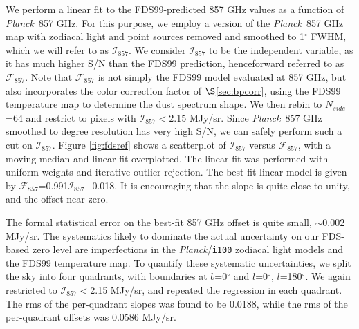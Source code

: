 \documentclass{emulateapj}
\newcommand{\PLANCK}{{\it Planck}}
\begin{document}
We perform a linear fit to the FDS99-predicted 857 GHz values as 
a function of \PLANCK~857 GHz. For this purpose, we employ a version of the 
\PLANCK~857 GHz map with zodiacal light and point sources removed and smoothed 
to 1$^{\circ}$ FWHM, which we will refer to as $\mathcal{I}_{857}$. We 
consider $\mathcal{I}_{857}$ to be the independent variable, as it has much 
higher S/N than the FDS99 prediction, henceforward referred to as 
$\mathcal{F}_{857}$. Note that $\mathcal{F}_{857}$ is not simply the FDS99
model evaluated at 857 GHz, but also incorporates the color correction factor 
of $\S$\ref{sec:bpcorr}, using the FDS99 temperature map to determine the dust 
spectrum shape. We then rebin to $N_{side}$=64 and restrict to pixels with 
$\mathcal{I}_{857}$$<$2.15 MJy/sr. Since \PLANCK~857 GHz smoothed to degree 
resolution has very high S/N, we can safely perform such a cut on 
$\mathcal{I}_{857}$. Figure \ref{fig:fdsref} shows a scatterplot of 
$\mathcal{I}_{857}$ versus $\mathcal{F}_{857}$, with a moving median and linear
fit overplotted. The linear fit was performed with uniform weights and 
iterative outlier rejection. The best-fit linear model is given by 
$\mathcal{F}_{857}$=0.991$\mathcal{I}_{857}$$-$0.018. It is encouraging that 
the slope is quite close to unity, and the offset near zero.


The formal statistical error on the best-fit 857 GHz offset is quite small, 
$\sim$0.002 MJy/sr. The systematics likely to dominate the actual uncertainty 
on our FDS-based zero level are imperfections in the \PLANCK/\verb|i100| 
zodiacal light models and the FDS99 temperature map. To quantify these 
systematic uncertainties, we split the sky into four quadrants, with boundaries
at $b$=0$^{\circ}$ and $l$=0$^{\circ}$, $l$=180$^{\circ}$. We again restricted 
to $\mathcal{I}_{857}$$<$2.15 MJy/sr, and repeated the regression in each 
quadrant. The rms of the per-quadrant slopes was found to be 0.0188, while the 
rms of the per-quadrant offsets was 0.0586 MJy/sr.



\end{document}
